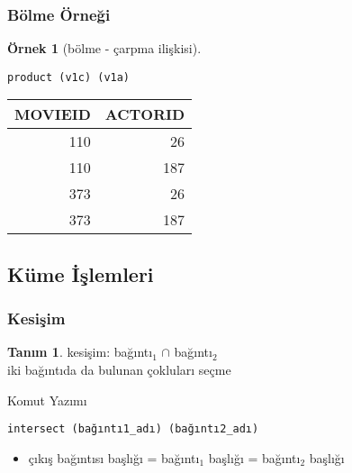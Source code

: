 \documentclass[dvipsnames]{beamer}
\theoremstyle{definition}
\newtheorem{tanim}[theorem]{Tanım}
\theoremstyle{example}
\newtheorem{ornek}[theorem]{Örnek}
\theoremstyle{plain}
\begin{document}
\begin{frame}[fragile]
  \frametitle{Bölme Örneği}

  \begin{ornek}[bölme - çarpma ilişkisi]
    \begin{lstlisting}
product (v1c) (v1a)
    \end{lstlisting}

    \pause
    \begin{tiny}
    \begin{table}
      \begin{tabular}{|r|r|}\hline
MOVIEID &  ACTORID\\\hline\hline
    110 &       26\\\hline
    110 &      187\\\hline
    373 &       26\\\hline
    373 &      187\\\hline
      \end{tabular}
    \end{table}
    \end{tiny}
  \end{ornek}
\end{frame}

\subsection{Küme İşlemleri}

\begin{frame}[fragile]
  \frametitle{Kesişim}

  \begin{tanim}
    \alert{kesişim}: bağıntı$_1$ $\cap$ bağıntı$_2$\\
      iki bağıntıda da bulunan çokluları seçme
  \end{tanim}

  \pause
  \begin{block}{Komut Yazımı}
    \begin{lstlisting}
intersect (bağıntı1_adı) (bağıntı2_adı)
    \end{lstlisting}
  \end{block}

  \pause
  \begin{itemize}
    \item çıkış bağıntısı başlığı = bağıntı$_1$ başlığı = bağıntı$_2$ başlığı
  \end{itemize}
\end{frame}
\end{document}
